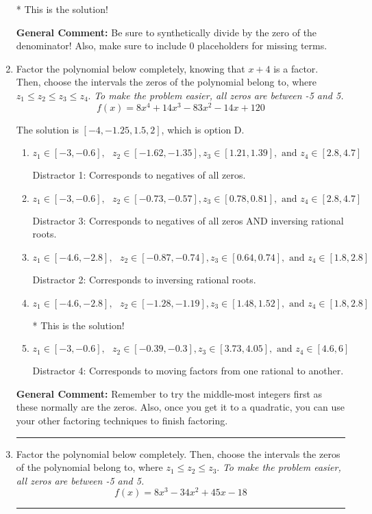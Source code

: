 \documentclass{extbook}[14pt]
\newcommand{\litem}[1]{\item #1

\rule{\textwidth}{0.4pt}}
\begin{document}
\begin{enumerate}
{\begin{enumerate}[label=\Alph*.]
* This is the solution!
\end{enumerate}

\textbf{General Comment:} Be sure to synthetically divide by the zero of the denominator! Also, make sure to include 0 placeholders for missing terms.
}
\litem{
Factor the polynomial below completely, knowing that $x+4$ is a factor. Then, choose the intervals the zeros of the polynomial belong to, where $z_1 \leq z_2 \leq z_3 \leq z_4$. \textit{To make the problem easier, all zeros are between -5 and 5.}
\[ f(x) = 8x^{4} +14 x^{3} -83 x^{2} -14 x + 120 \]

The solution is \( [-4, -1.25, 1.5, 2] \), which is option D.\begin{enumerate}[label=\Alph*.]
\item \( z_1 \in [-3, -0.6], \text{   }  z_2 \in [-1.62, -1.35], z_3 \in [1.21, 1.39], \text{   and   } z_4 \in [2.8, 4.7] \)

 Distractor 1: Corresponds to negatives of all zeros.
\item \( z_1 \in [-3, -0.6], \text{   }  z_2 \in [-0.73, -0.57], z_3 \in [0.78, 0.81], \text{   and   } z_4 \in [2.8, 4.7] \)

 Distractor 3: Corresponds to negatives of all zeros AND inversing rational roots.
\item \( z_1 \in [-4.6, -2.8], \text{   }  z_2 \in [-0.87, -0.74], z_3 \in [0.64, 0.74], \text{   and   } z_4 \in [1.8, 2.8] \)

 Distractor 2: Corresponds to inversing rational roots.
\item \( z_1 \in [-4.6, -2.8], \text{   }  z_2 \in [-1.28, -1.19], z_3 \in [1.48, 1.52], \text{   and   } z_4 \in [1.8, 2.8] \)

* This is the solution!
\item \( z_1 \in [-3, -0.6], \text{   }  z_2 \in [-0.39, -0.3], z_3 \in [3.73, 4.05], \text{   and   } z_4 \in [4.6, 6] \)

 Distractor 4: Corresponds to moving factors from one rational to another.
\end{enumerate}

\textbf{General Comment:} Remember to try the middle-most integers first as these normally are the zeros. Also, once you get it to a quadratic, you can use your other factoring techniques to finish factoring.
}
\litem{
Factor the polynomial below completely. Then, choose the intervals the zeros of the polynomial belong to, where $z_1 \leq z_2 \leq z_3$. \textit{To make the problem easier, all zeros are between -5 and 5.}
\[ f(x) = 8x^{3} -34 x^{2} +45 x -18 \]

}
\end{enumerate}
\end{document}

